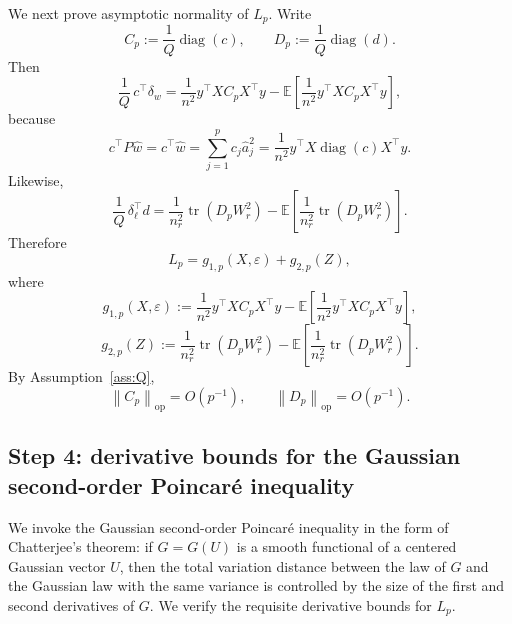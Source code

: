 \documentclass[11pt]{article}
\theoremstyle{definition}
\newcommand{\E}{\mathbb{E}}
\newcommand{\tr}{\operatorname{tr}}
\newcommand{\diag}{\operatorname{diag}}
\newcommand{\op}{\mathrm{op}}
\newcommand{\1}{\mathbf{1}}
\newcommand{\norm}[1]{\left\lVert #1 \right\rVert}
\begin{document}
We next prove asymptotic normality of $L_p$. Write
\[
 C_p:=\frac1Q\diag(c),
 \qquad
 D_p:=\frac1Q\diag(d).
\]
Then
\begin{equation}\label{eq:Lp-gwas}
 \frac1Q\,c^\top\delta_w
 =\frac1{n^2}y^\top X C_p X^\top y
 -\E\left[\frac1{n^2}y^\top X C_p X^\top y\right],
\end{equation}
because
\[
 c^\top P\widehat w=c^\top\widehat w
 =\sum_{j=1}^p c_j\widehat a_j^2
 =\frac1{n^2}y^\top X\diag(c)X^\top y.
\]
Likewise,
\begin{equation}\label{eq:Lp-ref}
 \frac1Q\,\delta_\ell^\top d
 =\frac1{n_r^2}\tr(D_pW_r^2)
 -\E\left[\frac1{n_r^2}\tr(D_pW_r^2)\right].
\end{equation}
Therefore
\begin{equation}\label{eq:Lp-split}
 L_p=g_{1,p}(X,\varepsilon)+g_{2,p}(Z),
\end{equation}
where
\[
 g_{1,p}(X,\varepsilon):=\frac1{n^2}y^\top X C_p X^\top y
 -\E\left[\frac1{n^2}y^\top X C_p X^\top y\right],
\]
\[
 g_{2,p}(Z):=\frac1{n_r^2}\tr(D_pW_r^2)
 -\E\left[\frac1{n_r^2}\tr(D_pW_r^2)\right].
\]
By Assumption~\ref{ass:Q},
\begin{equation}\label{eq:CpDp-bounds}
 \norm{C_p}_{\op}=O(p^{-1}),
 \qquad
 \norm{D_p}_{\op}=O(p^{-1}).
\end{equation}

\subsection*{Step 4: derivative bounds for the Gaussian second-order Poincar\'e inequality}

We invoke the Gaussian second-order Poincar\'e inequality in the form of Chatterjee's theorem: if $G=G(U)$ is a smooth functional of a centered Gaussian vector $U$, then the total variation distance between the law of $G$ and the Gaussian law with the same variance is controlled by the size of the first and second derivatives of $G$. We verify the requisite derivative bounds for $L_p$.
\end{document}
